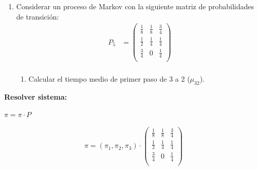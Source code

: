 \documentclass{templateNote}
\begin{document}
\begin{enumerate}
    \newpage
    \item Considerar un proceso de Markov con la siguiente matriz de probabilidades de transición:
    \begin{align*}
    P_5 &= \left(
        \begin{array}{ccc}    
            \frac{1}{8}   &  \frac{1}{8}    & \frac{3}{4}  \\
            \frac{1}{2}   &  \frac{1}{4}    & \frac{1}{4}  \\
            \frac{3}{4}   &       0         & \frac{1}{4}\\
        \end{array}
        \right)\\
    \end{align*}

    \begin{enumerate}[label=\alph*)]
        \item Calcular el tiempo medio de primer paso de 3 a 2 ($\mu_{32}$).
    \end{enumerate}

\end{enumerate}

\textbf{Resolver sistema:} 

$\pi = \pi \cdot P$

\begin{equation*}
    \pi = (\pi_1, \pi_2, \pi_3) 
    \cdot
    \begin{pmatrix}
        \frac{1}{8}   &  \frac{1}{8}    & \frac{3}{4}  \\
        \frac{1}{2}   &  \frac{1}{4}    & \frac{1}{4}  \\
        \frac{3}{4}   &       0         & \frac{1}{4}\\
    \end{pmatrix}
\end{equation*}
\end{document}
